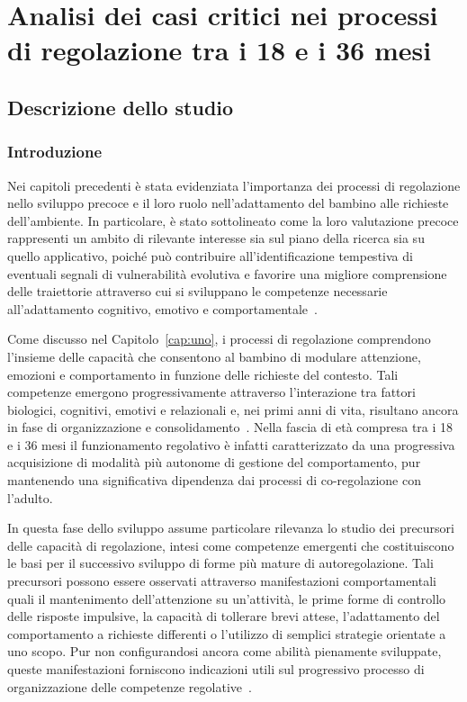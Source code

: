 \chapter{Analisi dei casi critici nei processi di regolazione tra i 18 e i 36 mesi}
\label{cap:quattro}

\section{Descrizione dello studio}
 \label{sec:4_1}

\FloatBarrier

 \subsection{Introduzione}
 \label{sec:4_1_1}

Nei capitoli precedenti è stata evidenziata l'importanza dei processi di regolazione nello sviluppo precoce e il loro ruolo nell'adattamento del bambino alle richieste dell'ambiente. In particolare, è stato sottolineato come la loro valutazione precoce rappresenti un ambito di rilevante interesse sia sul piano della ricerca sia su quello applicativo, poiché può contribuire all'identificazione tempestiva di eventuali segnali di vulnerabilità evolutiva e favorire una migliore comprensione delle traiettorie attraverso cui si sviluppano le competenze necessarie all'adattamento cognitivo, emotivo e comportamentale~\cite{blair2015}.

Come discusso nel Capitolo~\ref{cap:uno}, i processi di regolazione comprendono l'insieme delle capacità che consentono al bambino di modulare attenzione, emozioni e comportamento in funzione delle richieste del contesto. Tali competenze emergono progressivamente attraverso l'interazione tra fattori biologici, cognitivi, emotivi e relazionali e, nei primi anni di vita, risultano ancora in fase di organizzazione e consolidamento~\cite{kopp1982,calkins2007}. Nella fascia di età compresa tra i 18 e i 36 mesi il funzionamento regolativo è infatti caratterizzato da una progressiva acquisizione di modalità più autonome di gestione del comportamento, pur mantenendo una significativa dipendenza dai processi di co-regolazione con l'adulto.

In questa fase dello sviluppo assume particolare rilevanza lo studio dei precursori delle capacità di regolazione, intesi come competenze emergenti che costituiscono le basi per il successivo sviluppo di forme più mature di autoregolazione. Tali precursori possono essere osservati attraverso manifestazioni comportamentali quali il mantenimento dell'attenzione su un'attività, le prime forme di controllo delle risposte impulsive, la capacità di tollerare brevi attese, l'adattamento del comportamento a richieste differenti o l'utilizzo di semplici strategie orientate a uno scopo. Pur non configurandosi ancora come abilità pienamente sviluppate, queste manifestazioni forniscono indicazioni utili sul progressivo processo di organizzazione delle competenze regolative~\cite{garon2008}.

